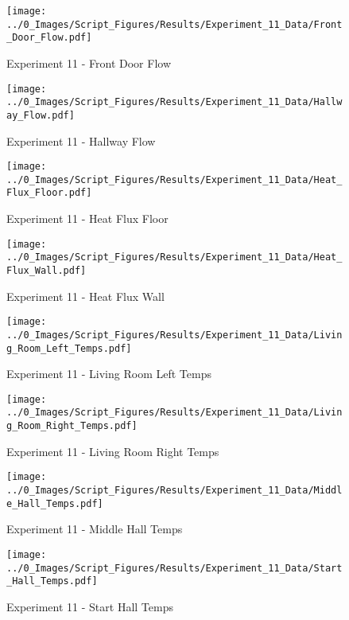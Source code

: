 	\begin{figure}[H]
		\centering
		\texttt{[image: ../0\_Images/Script\_Figures/Results/Experiment\_11\_Data/Front\_Door\_Flow.pdf]}
		\caption[]{Experiment 11 - Front Door Flow}
	\end{figure}
 
	\clearpage

	\begin{figure}[H]
		\centering
		\texttt{[image: ../0\_Images/Script\_Figures/Results/Experiment\_11\_Data/Hallway\_Flow.pdf]}
		\caption[]{Experiment 11 - Hallway Flow}
	\end{figure}
 

	\begin{figure}[H]
		\centering
		\texttt{[image: ../0\_Images/Script\_Figures/Results/Experiment\_11\_Data/Heat\_Flux\_Floor.pdf]}
		\caption[]{Experiment 11 - Heat Flux Floor}
	\end{figure}
 
	\clearpage

	\begin{figure}[H]
		\centering
		\texttt{[image: ../0\_Images/Script\_Figures/Results/Experiment\_11\_Data/Heat\_Flux\_Wall.pdf]}
		\caption[]{Experiment 11 - Heat Flux Wall}
	\end{figure}
 

	\begin{figure}[H]
		\centering
		\texttt{[image: ../0\_Images/Script\_Figures/Results/Experiment\_11\_Data/Living\_Room\_Left\_Temps.pdf]}
		\caption[]{Experiment 11 - Living Room Left Temps}
	\end{figure}
 
	\clearpage

	\begin{figure}[H]
		\centering
		\texttt{[image: ../0\_Images/Script\_Figures/Results/Experiment\_11\_Data/Living\_Room\_Right\_Temps.pdf]}
		\caption[]{Experiment 11 - Living Room Right Temps}
	\end{figure}
 

	\begin{figure}[H]
		\centering
		\texttt{[image: ../0\_Images/Script\_Figures/Results/Experiment\_11\_Data/Middle\_Hall\_Temps.pdf]}
		\caption[]{Experiment 11 - Middle Hall Temps}
	\end{figure}
 
	\clearpage

	\begin{figure}[H]
		\centering
		\texttt{[image: ../0\_Images/Script\_Figures/Results/Experiment\_11\_Data/Start\_Hall\_Temps.pdf]}
		\caption[]{Experiment 11 - Start Hall Temps}
	\end{figure}
 

